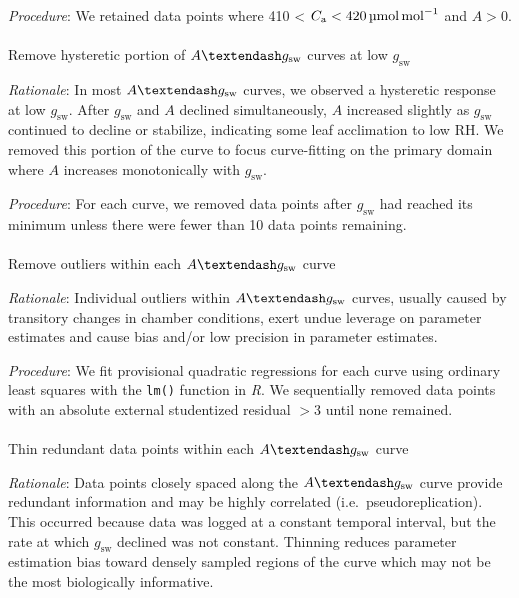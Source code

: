 \documentclass[
  letterpaper,
  DIV=11,
  numbers=noendperiod]{scrartcl}
\makeatletter
\let\oldparagraph\paragraph
\renewcommand{\paragraph}{
    \@ifstar
      \xxxParagraphStar
      \xxxParagraphNoStar
  }
\newcommand{\xxxParagraphStar}[1]{\oldparagraph*{#1}\mbox{}}
\newcommand{\xxxParagraphNoStar}[1]{\oldparagraph{#1}\mbox{}}
\newcommand{\agcurve}{$A \textendash g_\text{sw}$}
\newcommand{\cabetween}[2]{#1 < $C_\mathrm{a} < \qty{#2}{\micro\mol\raiseto{-1}\mol}$}
\newcommand{\gsw}{$g_\text{sw}$}
\newcommand{\rh}{$\mathrm{RH}$}
\makeatother
\begin{document}
\emph{Procedure}: We retained data points where \cabetween{410}{420} and
\(A> 0\).

\paragraph{\texorpdfstring{Remove hysteretic portion of \agcurve{}
curves at low
\gsw{}}{Remove hysteretic portion of  curves at low }}\label{remove-hysteretic-portion-of-curves-at-low}

\emph{Rationale}: In most \agcurve{} curves, we observed a hysteretic
response at low \gsw. After \gsw{} and \(A\) declined simultaneously,
\(A\) increased slightly as \gsw{} continued to decline or stabilize,
indicating some leaf acclimation to low \rh. We removed this portion of
the curve to focus curve-fitting on the primary domain where \(A\)
increases monotonically with \gsw{}.

\emph{Procedure}: For each curve, we removed data points after \gsw{}
had reached its minimum unless there were fewer than 10 data points
remaining.

\paragraph{\texorpdfstring{Remove outliers within each \agcurve{}
curve}{Remove outliers within each  curve}}\label{remove-outliers-within-each-curve}

\emph{Rationale}: Individual outliers within \agcurve{} curves, usually
caused by transitory changes in chamber conditions, exert undue leverage
on parameter estimates and cause bias and/or low precision in parameter
estimates.

\emph{Procedure}: We fit provisional quadratic regressions for each
curve using ordinary least squares with the \texttt{lm()} function in
\emph{R}. We sequentially removed data points with an absolute external
studentized residual \(> 3\) until none remained.

\paragraph{\texorpdfstring{Thin redundant data points within each
\agcurve{}
curve}{Thin redundant data points within each  curve}}\label{thin-redundant-data-points-within-each-curve}

\emph{Rationale}: Data points closely spaced along the \agcurve{} curve
provide redundant information and may be highly correlated
(i.e.~pseudoreplication). This occurred because data was logged at a
constant temporal interval, but the rate at which \gsw{} declined was
not constant. Thinning reduces parameter estimation bias toward densely
sampled regions of the curve which may not be the most biologically
informative.
\end{document}
